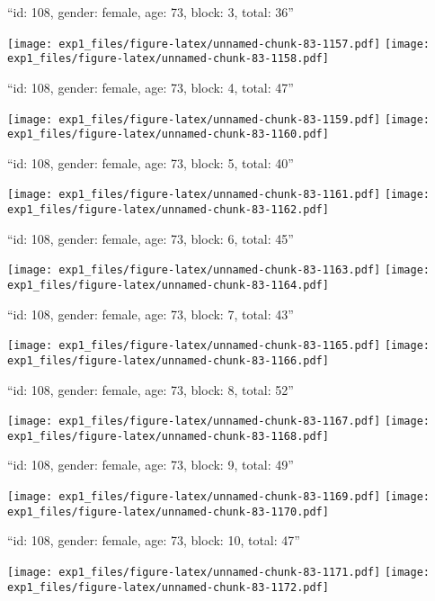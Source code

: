 \documentclass[11pt,,]{article}
\begin{document}
\newpage
[1] 

``id: 108, gender: female, age: 73, block: 3, total: 36''

\texttt{[image: exp1\_files/figure-latex/unnamed-chunk-83-1157.pdf]}
\texttt{[image: exp1\_files/figure-latex/unnamed-chunk-83-1158.pdf]}

\newpage
[1] 

``id: 108, gender: female, age: 73, block: 4, total: 47''

\texttt{[image: exp1\_files/figure-latex/unnamed-chunk-83-1159.pdf]}
\texttt{[image: exp1\_files/figure-latex/unnamed-chunk-83-1160.pdf]}

\newpage
[1] 

``id: 108, gender: female, age: 73, block: 5, total: 40''

\texttt{[image: exp1\_files/figure-latex/unnamed-chunk-83-1161.pdf]}
\texttt{[image: exp1\_files/figure-latex/unnamed-chunk-83-1162.pdf]}

\newpage
[1] 

``id: 108, gender: female, age: 73, block: 6, total: 45''

\texttt{[image: exp1\_files/figure-latex/unnamed-chunk-83-1163.pdf]}
\texttt{[image: exp1\_files/figure-latex/unnamed-chunk-83-1164.pdf]}

\newpage
[1] 

``id: 108, gender: female, age: 73, block: 7, total: 43''

\texttt{[image: exp1\_files/figure-latex/unnamed-chunk-83-1165.pdf]}
\texttt{[image: exp1\_files/figure-latex/unnamed-chunk-83-1166.pdf]}

\newpage
[1] 

``id: 108, gender: female, age: 73, block: 8, total: 52''

\texttt{[image: exp1\_files/figure-latex/unnamed-chunk-83-1167.pdf]}
\texttt{[image: exp1\_files/figure-latex/unnamed-chunk-83-1168.pdf]}

\newpage
[1] 

``id: 108, gender: female, age: 73, block: 9, total: 49''

\texttt{[image: exp1\_files/figure-latex/unnamed-chunk-83-1169.pdf]}
\texttt{[image: exp1\_files/figure-latex/unnamed-chunk-83-1170.pdf]}

\newpage
[1] 

``id: 108, gender: female, age: 73, block: 10, total: 47''

\texttt{[image: exp1\_files/figure-latex/unnamed-chunk-83-1171.pdf]}
\texttt{[image: exp1\_files/figure-latex/unnamed-chunk-83-1172.pdf]}
\end{document}
